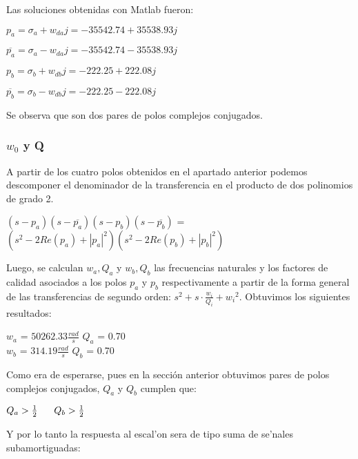 \documentclass[12pt, titlepage]{article}
\begin{document}
    Las soluciones obtenidas con Matlab fueron:
    \begin{center}
    $ p_{a} = \sigma_a + w_{da}j =  -35542.74 + 35538.93j$
    
    $\overline{p_{a}}= \sigma_a - w_{da}j =-35542.74 - 35538.93j$
    
    $p_{b} = \sigma_b + w_{db}j =-222.25 + 222.08j$
    
    $\overline{p_{b}} = \sigma_b - w_{db}j =-222.25 - 222.08j$
    \end{center}
    
    Se observa que son dos pares de polos complejos conjugados.

    \subsubsection{$w_0$ y Q}
    A partir de los cuatro polos obtenidos en el apartado anterior podemos descomponer el denominador de la transferencia en el producto de dos polinomios de grado 2. 
    
    \begin{center}
    $(s-p_{a})(s-\overline{p_{a}})(s-p_{b})(s-\overline{p_{b}})$ = $(s^2 - 2Re(p_{a}) + |p_{a}|^2)(s^2 - 2Re(p_{b}) + |p_{b}|^2)$
    \end{center}
    
    Luego, se calculan $w_a, Q_a$ y $w_b, Q_b$ las frecuencias naturales y los factores de calidad asociados a los polos $p_{a}$ y $p_{b}$ respectivamente a partir de la forma general de las transferencias de segundo orden: $s^2 + s \cdot \frac{w_i}{Q_i} + {w_i}^2$. Obtuvimos los siguientes resultados: 
    \begin{center}
    $w_a$ =  $50262.33\frac{rad}{s}$ \hspace{7mm}
    $Q_a$ =    0.70\\
    $w_b$ =  $314.19\frac{rad}{s}$ \hspace{7mm}
    $Q_b$ =    0.70\\
    \end{center}
    
    Como era de esperarse, pues en la sección anterior obtuvimos pares de polos complejos conjugados, $Q_{a}$ y $Q_{b}$ cumplen que: 
    
    \begin{center}
        $Q_{a} > \frac{1}{2} \hspace{6mm} Q_{b}>\frac{1}{2}$
    \end{center}
    
    Y por lo tanto la respuesta al escal'on sera de tipo suma de se'nales subamortiguadas:
    
\end{document}

